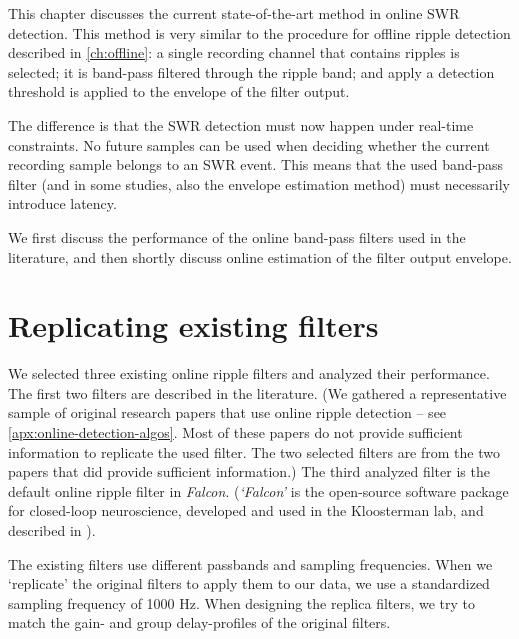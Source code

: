 \label{ch:BPF}

This chapter discusses the current state-of-the-art method in online SWR detection. This method is very similar to the procedure for offline ripple detection described in \cref{ch:offline}: a single recording channel that contains ripples is selected; it is band-pass filtered through the ripple band; and apply a detection threshold is applied to the envelope of the filter output.

The difference is that the SWR detection must now happen under real-time constraints. No future samples can be used when deciding whether the current recording sample belongs to an SWR event. This means that the used band-pass filter (and in some studies, also the envelope estimation method) must necessarily introduce latency.

We first discuss the performance of the online band-pass filters used in the literature, and then shortly discuss online estimation of the filter output envelope.


\section{Replicating existing filters}

We selected three existing online ripple filters and analyzed their performance. The first two filters are described in the literature. (We gathered a representative sample of original research papers that use online ripple detection -- see \cref{apx:online-detection-algos}. Most of these papers do not provide sufficient information to replicate the used filter. The two selected filters are from the two papers that did provide sufficient information.)
The third analyzed filter is the default online ripple filter in \emph{Falcon}. (\emph{`Falcon'} is the open-source software package for closed-loop neuroscience, developed and used in the Kloosterman lab, and described in ).

The existing filters use different passbands and sampling frequencies. When we `replicate' the original filters to apply them to our data, we use a standardized sampling frequency of 1000 Hz. When designing the replica filters, we try to match the gain- and group delay-profiles of the original filters.

